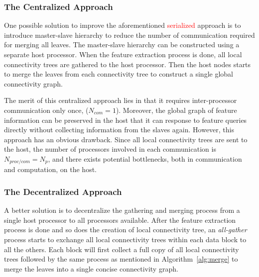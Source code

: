 \documentclass[10pt, conference, compsocconf]{IEEEtran}
\begin{document}

\subsubsection{The Centralized Approach}

One possible solution to improve the aforementioned \textcolor{red}{serialized} approach is to introduce master-slave hierarchy to reduce the number of communication required for merging all leaves. The master-slave hierarchy can be constructed using a separate host processor. When the feature extraction process is done, all local connectivity trees are gathered to the host processor. Then the host nodes starts to merge the leaves from each connectivity tree to construct a single global connectivity graph.

The merit of this centralized approach lies in that it requires inter-processor communication only once, ($N_{com} = 1$). Moreover, the global graph of feature information can be preserved in the host that it can response to feature queries directly without collecting information from the slaves again. However, this approach has an obvious drawback. Since all local connectivity trees are sent to the host, the number of processors involved in each communication is $N_{proc/com} = N_p$, and there exists potential bottlenecks, both in communication and computation, on the host.

\subsubsection{The Decentralized Approach}

A better solution is to decentralize the gathering and merging process from a single host processor to all processors available. After the feature extraction process is done and so does the creation of local connectivity tree, an \emph{all-gather} process starts to exchange all local connectivity trees within each data block to all the others. Each block will first collect a full copy of all local connectivity trees followed by the same process as mentioned in Algorithm~\ref{alg:merge} to merge the leaves into a single concise connectivity graph.
\end{document}
